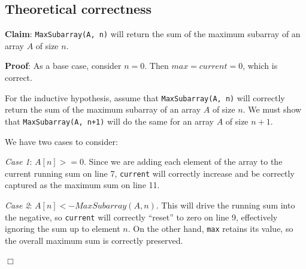 \documentclass[a4paper,10pt]{article}
\begin{document}
\begin{samepage}
	\section{Theoretical correctness}
		{\bf Claim}: {\tt MaxSubarray(A, n)} will return the sum of the maximum subarray of an array $A$ of size $n$.

		{\bf Proof}: As a base case, consider $n=0$. Then $max = current = 0$, which is correct.

		For the inductive hypothesis, assume that {\tt MaxSubarray(A, n)} will correctly return the sum of the maximum subarray of an array $A$ of size $n$. We must show that {\tt MaxSubarray(A, n+1)} will do the same for an array $A$ of size $n+1$.
		
		We have two cases to consider:

		{\it Case 1}: $A[n] >= 0$. Since we are adding each element of the array to the current running sum on line 7, {\tt current} will correctly increase and be correctly captured as the maximum sum on line 11.

		{\it Case 2}: $A[n] < -MaxSubarray(A, n)$. This will drive the running sum into the negative, so {\tt current} will correctly ``reset'' to zero on line 9, effectively ignoring the sum up to element $n$. On the other hand, {\tt max} retains its value, so the overall maximum sum is correctly preserved.

		\begin{center}
		$\Box$
		\end{center}

\end{samepage} 
\end{document}
